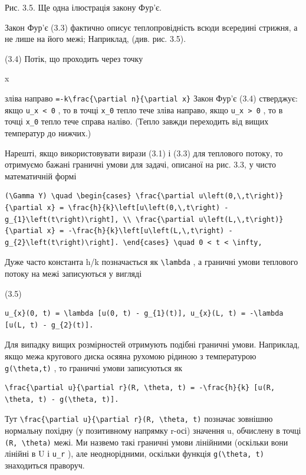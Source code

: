 \documentclass[
  ukrainian,
]{article}
\begin{document}
Рис. 3.5. Ще одна ілюстрація закону Фур'є.

Закон Фур'є (3.3) фактично описує теплопровідність всюди всередині
стрижня, а не лише на його межі; Наприклад, (див. рис. 3.5).

(3.4) Потік, що проходить через точку

x

зліва направо
\texttt{=-k\textbackslash{}frac\{\textbackslash{}partial\ n\}\{\textbackslash{}partial\ x\}}
Закон Фур'є (3.4) стверджує: якщо \texttt{u\_x\ \textless{}\ 0} , то в
точці \texttt{x\_0} тепло тече зліва направо, якщо
\texttt{u\_x\ \textgreater{}\ 0} , то в точці \texttt{x\_0} тепло тече
справа наліво. (Тепло завжди переходить від вищих температур до нижчих.)

Нарешті, якщо використовувати вирази (3.1) і (3.3) для теплового потоку,
то отримуємо бажані граничні умови для задачі, описаної на рис. 3.3, у
чисто математичній формі

\begin{verbatim}
(\Gamma Y) \quad \begin{cases} \frac{\partial u\left(0,\,t\right)}{\partial x} = \frac{h}{k}\left[u\left(0,\,t\right) - g_{1}\left(t\right)\right], \\ \frac{\partial u\left(L,\,t\right)}{\partial x} = -\frac{h}{k}\left[u\left(L,\,t\right) - g_{2}\left(t\right)\right]. \end{cases} \quad 0 < t < \infty,
\end{verbatim}

Дуже часто константа h/k позначається як \texttt{\textbackslash{}lambda}
, а граничні умови теплового потоку на межі записуються у вигляді

(3.5)

\begin{verbatim}
u_{x}(0, t) = \lambda [u(0, t) - g_{1}(t)], u_{x}(L, t) = -\lambda [u(L, t) - g_{2}(t)].
\end{verbatim}

Для випадку вищих розмірностей отримують подібні граничні умови.
Наприклад, якщо межа кругового диска осяяна рухомою рідиною з
температурою \texttt{g(\textbackslash{}theta,t)} , то граничні умови
записуються як

\begin{verbatim}
\frac{\partial u}{\partial r}(R, \theta, t) = -\frac{h}{k} [u(R, \theta, t) - g(\theta, t)].
\end{verbatim}

Тут
\texttt{\textbackslash{}frac\{\textbackslash{}partial\ u\}\{\textbackslash{}partial\ r\}(R,\ \textbackslash{}theta,\ t)}
позначає зовнішню нормальну похідну (у позитивному напрямку r-осі)
значення u, обчислену в точці \texttt{(R,\ \textbackslash{}theta)} межі.
Ми назвемо такі граничні умови лінійними (оскільки вони лінійні в U і
\texttt{u\_r} ), але неоднорідними, оскільки функція
\texttt{g(\textbackslash{}theta,\ t)} знаходиться праворуч.
\end{document}
